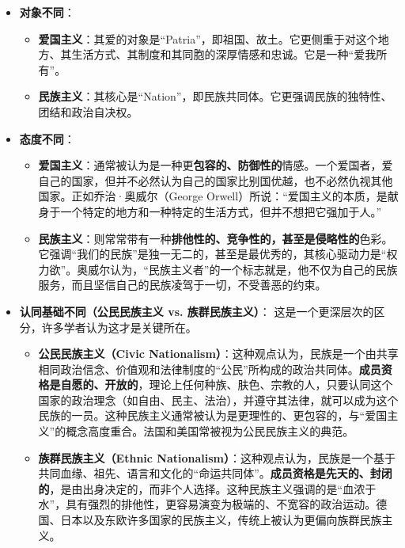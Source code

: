 \begin{itemize}[noitemsep,topsep=0pt]
    \item \textbf{对象不同}：
    \begin{itemize}[noitemsep,topsep=0pt]
        \item \textbf{爱国主义}：其爱的对象是“Patria”，即祖国、故土。它更侧重于对这个地方、其生活方式、其制度和其同胞的深厚情感和忠诚。它是一种“爱我所有”。
        \item \textbf{民族主义}：其核心是“Nation”，即民族共同体。它更强调民族的独特性、团结和政治自决权。
    \end{itemize}
    \item \textbf{态度不同}：
    \begin{itemize}[noitemsep,topsep=0pt]
        \item \textbf{爱国主义}：通常被认为是一种更\textbf{包容的、防御性的}情感。一个爱国者，爱自己的国家，但并不必然认为自己的国家比别国优越，也不必然仇视其他国家。正如乔治·奥威尔（George Orwell）所说：“爱国主义的本质，是献身于一个特定的地方和一种特定的生活方式，但并不想把它强加于人。”
        \item \textbf{民族主义}：则常常带有一种\textbf{排他性的、竞争性的，甚至是侵略性的}色彩。它强调“我们的民族”是独一无二的，甚至是最优秀的，其核心驱动力是“权力欲”。奥威尔认为，“民族主义者”的一个标志就是，他不仅为自己的民族服务，而且坚信自己的民族凌驾于一切，不受善恶的约束。
    \end{itemize}
    \item \textbf{认同基础不同（公民民族主义 vs. 族群民族主义）}：
    这是一个更深层次的区分，许多学者认为这才是关键所在。
    \begin{itemize}[noitemsep,topsep=0pt]
        \item \textbf{公民民族主义（Civic Nationalism）}：这种观点认为，民族是一个由共享相同政治信念、价值观和法律制度的“公民”所构成的政治共同体。\textbf{成员资格是自愿的、开放的}，理论上任何种族、肤色、宗教的人，只要认同这个国家的政治理念（如自由、民主、法治），并遵守其法律，就可以成为这个民族的一员。这种民族主义通常被认为是更理性的、更包容的，与“爱国主义”的概念高度重合。法国和美国常被视为公民民族主义的典范。
        \item \textbf{族群民族主义（Ethnic Nationalism）}：这种观点认为，民族是一个基于共同血缘、祖先、语言和文化的“命运共同体”。\textbf{成员资格是先天的、封闭的}，是由出身决定的，而非个人选择。这种民族主义强调的是“血浓于水”，具有强烈的排他性，更容易演变为极端的、不宽容的政治运动。德国、日本以及东欧许多国家的民族主义，传统上被认为更偏向族群民族主义。
    \end{itemize}
\end{itemize}

